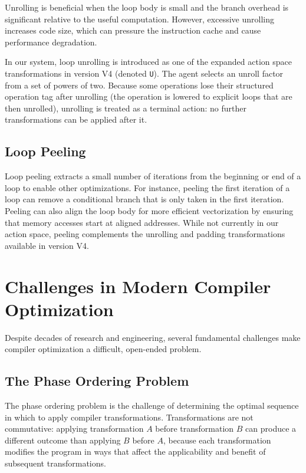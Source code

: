 Unrolling is beneficial when the loop body is small and the branch overhead is significant relative to the useful computation. However, excessive unrolling increases code size, which can pressure the instruction cache and cause performance degradation.

In our system, loop unrolling is introduced as one of the expanded action space transformations in version V4 (denoted \texttt{U}). The agent selects an unroll factor from a set of powers of two. Because some operations lose their structured operation tag after unrolling (the operation is lowered to explicit loops that are then unrolled), unrolling is treated as a terminal action: no further transformations can be applied after it.

\subsection{Loop Peeling}

Loop peeling extracts a small number of iterations from the beginning or end of a loop to enable other optimizations. For instance, peeling the first iteration of a loop can remove a conditional branch that is only taken in the first iteration. Peeling can also align the loop body for more efficient vectorization by ensuring that memory accesses start at aligned addresses. While not currently in our action space, peeling complements the unrolling and padding transformations available in version V4.

\section{Challenges in Modern Compiler Optimization}

Despite decades of research and engineering, several fundamental challenges make compiler optimization a difficult, open-ended problem.

\subsection{The Phase Ordering Problem}

The phase ordering problem is the challenge of determining the optimal sequence in which to apply compiler transformations. Transformations are not commutative: applying transformation $A$ before transformation $B$ can produce a different outcome than applying $B$ before $A$, because each transformation modifies the program in ways that affect the applicability and benefit of subsequent transformations.

